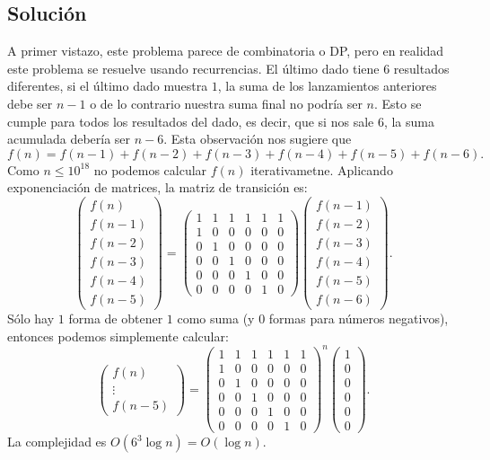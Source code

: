 \subsection*{Solución}
A primer vistazo, este problema parece de combinatoria o DP, pero en realidad este problema se resuelve usando recurrencias. El último dado tiene $6$ resultados diferentes, si el último dado muestra $1$, la suma de los lanzamientos anteriores debe ser $n-1$ o de lo contrario nuestra suma final no podría ser $n$. Esto se cumple para todos los resultados del dado, es decir, que si nos sale $6$, la suma acumulada debería ser $n-6$. Esta observación nos sugiere que
\[f(n)=f(n-1)+f(n-2)+f(n-3)+f(n-4)+f(n-5)+f(n-6).\]
Como $n\leq10^{18}$ no podemos calcular $f(n)$ iterativametne. Aplicando exponenciación de matrices, la matriz de transición es:
\[
\begin{pmatrix} f(n)\\ f(n-1)\\ f(n-2)\\ f(n-3)\\ f(n-4)\\ f(n-5) \end{pmatrix}
=
\begin{pmatrix}
1 & 1 & 1 & 1 & 1 & 1 \\
1 & 0 & 0 & 0 & 0 & 0 \\
0 & 1 & 0 & 0 & 0 & 0 \\
0 & 0 & 1 & 0 & 0 & 0 \\
0 & 0 & 0 & 1 & 0 & 0 \\
0 & 0 & 0 & 0 & 1 & 0
\end{pmatrix}
\begin{pmatrix} f(n-1)\\ f(n-2)\\ f(n-3)\\ f(n-4)\\ f(n-5)\\ f(n-6) \end{pmatrix}.
\]
Sólo hay $1$ forma de obtener $1$ como suma (y $0$ formas para números negativos), entonces podemos simplemente calcular:
\[
\begin{pmatrix} f(n)\\ \vdots\\ f(n-5) \end{pmatrix}
=
\begin{pmatrix}
1 & 1 & 1 & 1 & 1 & 1 \\
1 & 0 & 0 & 0 & 0 & 0 \\
0 & 1 & 0 & 0 & 0 & 0 \\
0 & 0 & 1 & 0 & 0 & 0 \\
0 & 0 & 0 & 1 & 0 & 0 \\
0 & 0 & 0 & 0 & 1 & 0
\end{pmatrix}^{n}
\begin{pmatrix} 1\\ 0\\ 0\\ 0\\ 0\\ 0 \end{pmatrix}.
\]
La complejidad es $O(6^3 \log n) = O(\log n)$.

